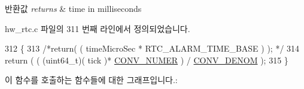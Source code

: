 \begin{DoxyRetVals}{반환값}
{\em returns} & time in milliseconds \\
\hline
\end{DoxyRetVals}


hw\+\_\+rtc.\+c 파일의 311 번째 라인에서 정의되었습니다.


\begin{DoxyCode}
312 \{
313 \textcolor{comment}{/*return( ( timeMicroSec * RTC\_ALARM\_TIME\_BASE ) ); */}
314   \textcolor{keywordflow}{return}  ( ( (uint64\_t)( tick )* \mbox{\hyperlink{hw__rtc_8c_a8dbad53513ea56467eac68d23a1baf49}{CONV\_NUMER}} ) / \mbox{\hyperlink{hw__rtc_8c_a661badebd0364de871f2cd2d0b185c55}{CONV\_DENOM}} );
315 \}
\end{DoxyCode}
이 함수를 호출하는 함수들에 대한 그래프입니다.\+:
